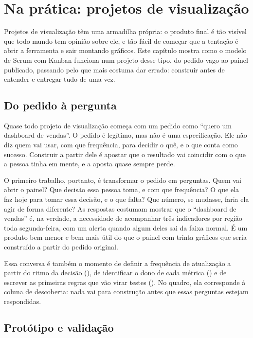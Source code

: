 \chapter{Na prática: projetos de visualização}
\label{cap:proj-visualizacao}

Projetos de visualização têm uma armadilha própria: o produto final é tão visível que todo
mundo tem opinião sobre ele, e tão fácil de começar que a tentação é abrir a ferramenta e
sair montando gráficos. Este capítulo mostra como o modelo de Scrum com Kanban funciona num
projeto desse tipo, do pedido vago ao painel publicado, passando pelo que mais costuma dar
errado: construir antes de entender e entregar tudo de uma vez.

\section{Do pedido à pergunta}
\label{sec:pedido-pergunta}

Quase todo projeto de visualização começa com um pedido como \enquote{quero um dashboard de
vendas}. O pedido é legítimo, mas não é uma especificação. Ele não diz quem vai usar, com que
frequência, para decidir o quê, e o que conta como sucesso. Construir a partir dele é
apostar que o resultado vai coincidir com o que a pessoa tinha em mente, e a aposta quase
sempre perde.

O primeiro trabalho, portanto, é transformar o pedido em perguntas. Quem vai abrir o painel?
Que decisão essa pessoa toma, e com que frequência? O que ela faz hoje para tomar essa
decisão, e o que falta? Que número, se mudasse, faria ela agir de forma diferente? As
respostas costumam mostrar que o \enquote{dashboard de vendas} é, na verdade, a necessidade de
acompanhar três indicadores por região toda segunda-feira, com um alerta quando algum deles
sai da faixa normal. É um produto bem menor e bem mais útil do que o painel com trinta gráficos
que seria construído a partir do pedido original.

Essa conversa é também o momento de definir a frequência de atualização a partir do ritmo da
decisão (), de identificar o dono de cada métrica
() e de escrever as primeiras regras que vão virar testes ().
No quadro, ela corresponde à coluna de descoberta: nada vai para construção antes que essas
perguntas estejam respondidas.

\section{Protótipo e validação}
\label{sec:prototipo}

